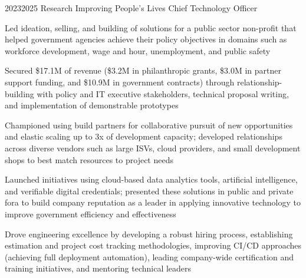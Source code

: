 \job
  {2023}{2025}
  {Research Improving People's Lives}
  {Chief Technology Officer}
  {\begin{achievements}
    \item Led ideation, selling, and building of solutions for a public sector non-profit that helped government agencies achieve their policy objectives in domains such as workforce development, wage and hour, unemployment, and public safety
    \item Secured \$17.1M of revenue (\$3.2M in philanthropic grants, \$3.0M in partner support funding, and \$10.9M in government contracts) through relationship-building with policy and IT executive stakeholders, technical proposal writing, and implementation of demonstrable prototypes
    \item Championed using build partners for collaborative pursuit of new opportunities and elastic scaling up to 3x of development capacity; developed relationships across diverse vendors such as large ISVs, cloud providers, and small development shops to best match resources to project needs
    \item Launched initiatives using cloud-based data analytics tools, artificial intelligence, and verifiable digital credentials; presented these solutions in public and private fora to build company reputation as a leader in applying innovative technology to improve government efficiency and effectiveness
    \item Drove engineering excellence by developing a robust hiring process, establishing estimation and project cost tracking methodologies, improving CI/CD approaches (achieving full deployment automation), leading company-wide certification and training initiatives, and mentoring technical leaders
  \end{achievements}}

